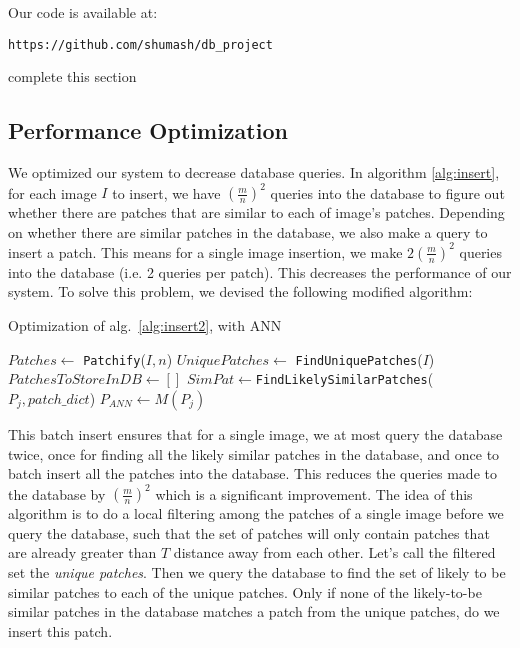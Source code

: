 Our code is available at:
\begin{verbatim}
https://github.com/shumash/db_project
\end{verbatim}

\begin{edit}
complete this section
\end{edit}

\subsection{Performance Optimization}

We optimized our system to decrease database queries. In algorithm \ref{alg:insert}, for each image $I$ to insert, we have $\left(\frac{m}{n}\right)^2$ queries into the database to figure out whether there are patches that are similar to each of image's patches. Depending on whether there are similar patches in the database, we also make a query to insert a patch. This means for a single image insertion, we make $2\left(\frac{m}{n}\right)^2$ queries into the database (i.e. 2 queries per patch). This decreases the performance of our system. To solve this problem, we devised the following modified algorithm:

\begin{algorithm}
    \caption{Optimization of alg.~\ref{alg:insert2}, with ANN}
    \label{alg:optimized}
\begin{algorithmic}[1]
\State $Patches \leftarrow $ \texttt{Patchify}($I,n$)
\State $UniquePatches \leftarrow$ \texttt{FindUniquePatches}($I$)
\State $PatchesToStoreInDB \leftarrow []$
\State $SimPat \leftarrow $\texttt{FindLikelySimilarPatches}($P_j,patch\_dict$)
\State $P_{ANN} \leftarrow M(P_j)$
\EndIf
\EndFor
{}
\vspace{3mm}
\end{algorithmic}
\end{algorithm}

This batch insert ensures that for a single image, we at most query the database twice, once for finding all the likely similar patches in the database, and once to batch insert all the patches into the database. This reduces the queries made to the database by $\left(\frac{m}{n}\right)^2$ which is a significant improvement. 
The idea of this algorithm is to do a local filtering among the patches of a single image before we query the database, such that the set of patches will only contain patches that are already greater than $T$ distance away from each other.  Let's call the filtered set the \emph{unique patches}. Then we query the database to find the set of likely to be similar patches to each of the unique patches. Only if none of the likely-to-be similar patches in the database matches a patch from the unique patches, do we insert this patch. 

